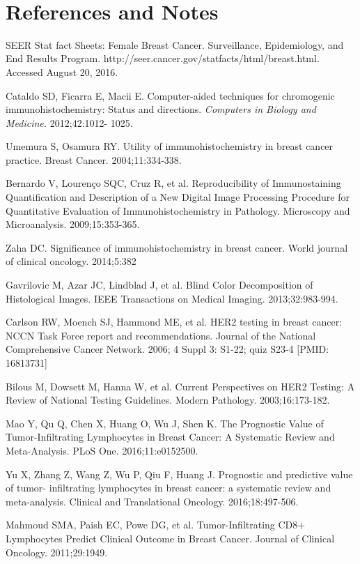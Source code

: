 \documentclass[12pt]{article}
\begin{document}
\

\section*{References and Notes}

\noindent[1] SEER Stat fact Sheets: Female Breast Cancer. Surveillance, Epidemiology, and End Results
Program. http://seer.cancer.gov/statfacts/html/breast.html. Accessed August 20, 2016.

\noindent[2] Cataldo SD, Ficarra E, Macii E. Computer-aided techniques for chromogenic
immunohistochemistry: Status and directions. \textit{Computers in Biology and Medicine.} 2012;42:1012-
1025.

\noindent[3] Umemura S, Osamura RY. Utility of immunohistochemistry in breast cancer practice. Breast
Cancer. 2004;11:334-338.

\noindent[4] Bernardo V, Lourenço SQC, Cruz R, et al. Reproducibility of Immunostaining Quantification and
Description of a New Digital Image Processing Procedure for Quantitative Evaluation of
Immunohistochemistry in Pathology. Microscopy and Microanalysis. 2009;15:353-365.

\noindent[5] Zaha DC. Significance of immunohistochemistry in breast cancer. World journal of clinical
oncology. 2014;5:382

\noindent[6] Gavrilovic M, Azar JC, Lindblad J, et al. Blind Color Decomposition of Histological Images. IEEE
Transactions on Medical Imaging. 2013;32:983-994.

\noindent[7] Carlson RW, Moench SJ, Hammond ME, et al. HER2 testing in breast cancer: NCCN Task Force
report and recommendations. Journal of the National Comprehensive Cancer Network. 2006; 4 Suppl
3: S1-22; quiz S23-4 [PMID:
16813731]

\noindent[8] Bilous M, Dowsett M, Hanna W, et al. Current Perspectives on HER2 Testing: A Review of
National Testing Guidelines. Modern Pathology. 2003;16:173-182.

\noindent[9] Mao Y, Qu Q, Chen X, Huang O, Wu J, Shen K. The Prognostic Value of Tumor-Infiltrating
Lymphocytes in Breast Cancer: A Systematic Review and Meta-Analysis. PLoS One.
2016;11:e0152500.

\noindent[10] Yu X, Zhang Z, Wang Z, Wu P, Qiu F, Huang J. Prognostic and predictive value of tumor-
infiltrating lymphocytes in breast cancer: a systematic review and meta-analysis. Clinical and
Translational Oncology. 2016;18:497-506.

\noindent[11] Mahmoud SMA, Paish EC, Powe DG, et al. Tumor-Infiltrating CD8+ Lymphocytes Predict
Clinical Outcome in Breast Cancer. Journal of Clinical Oncology. 2011;29:1949.
\end{document}
